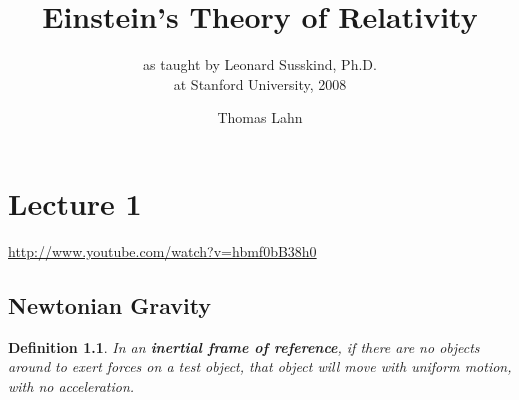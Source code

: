 \documentclass[pagesize,headsepline,10pt,parskip=half,BCOR=12mm]{scrreprt}
\newtheorem{mydef}{Definition}
\begin{document}

  \begin{titlepage}
    \title{Einstein's Theory of Relativity}
    \subtitle{as taught by Leonard\xspace Susskind,
    Ph.D.\xspace \\
      at Stanford University, 2008}
    \author{Thomas Lahn}
    \maketitle
  \end{titlepage}

  \clearpage
  \begin{spacing}{1}
    \tableofcontents
    \thispagestyle{empty}
  \end{spacing}


  \clearpage
  \chapter{Lecture 1}\label{chapter:introduction}
    \url{http://www.youtube.com/watch?v=hbmf0bB38h0}
    \section{Newtonian Gravity}
      \begin{mydef}
      In an \textbf{inertial frame of reference}, if there are no
      objects around to exert forces on a test object, that object
      will move with uniform motion, with no acceleration.
      \end{mydef}
\end{document}
